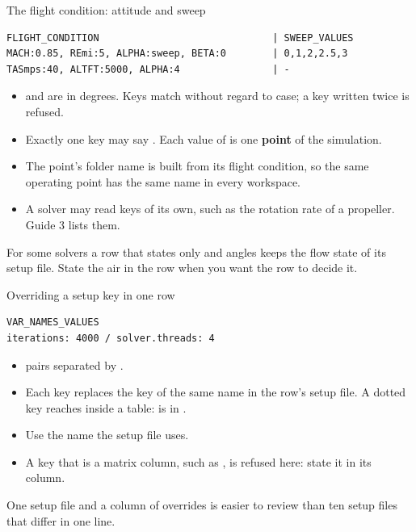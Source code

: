 \begin{frame}[fragile]{The flight condition: attitude and sweep}
\begin{lstlisting}
FLIGHT_CONDITION                              | SWEEP_VALUES
MACH:0.85, REmi:5, ALPHA:sweep, BETA:0        | 0,1,2,2.5,3
TASmps:40, ALTFT:5000, ALPHA:4                | -
\end{lstlisting}
\begin{itemize}\small
  \item {} and  are in degrees. Keys match without
        regard to case; a key written twice is refused.
  \item Exactly one key may say . Each value of
         is one \textbf{point} of the simulation.
  \item The point's folder name is built from its flight condition, so the
        same operating point has the same name in every workspace.
  \item A solver may read keys of its own, such as the rotation rate of a
        propeller. Guide 3 lists them.
\end{itemize}
\begin{cfdbpitfall}
For some solvers a row that states only  and angles keeps the flow
state of its setup file. State the air in the row when you want the row to
decide it.
\end{cfdbpitfall}
\end{frame}

\begin{frame}[fragile]{Overriding a setup key in one row}
\begin{lstlisting}
VAR_NAMES_VALUES
iterations: 4000 / solver.threads: 4
\end{lstlisting}
\begin{itemize}
  \item {} pairs separated by \code{ / }.
  \item Each key replaces the key of the same name in the row's setup file.
        A dotted key reaches inside a table:  is
         in \code{[solver]}.
  \item Use the name the setup file uses.
  \item A key that is a matrix column, such as , is refused
        here: state it in its column.
\end{itemize}
\begin{takeaway}One setup file and a column of overrides is easier to review
than ten setup files that differ in one line.\end{takeaway}
\end{frame}

